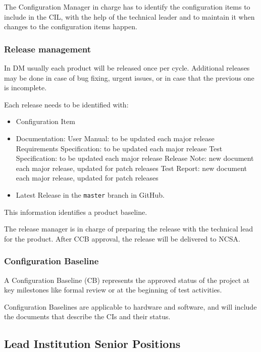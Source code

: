 The Configuration Manager in charge has to identify the configuration items to include in the CIL, with the help of the technical leader and to maintain it when changes to the configuration items happen.


\subsubsection{Release management\label{sect:relMng}}

In DM usually each product will be released once per cycle.
Additional releases may be done in case of bug fixing, urgent issues, or in case that the previous one is incomplete.

Each release needs to be identified with:

\begin{itemize}
\item Configuration Item
\item Documentation:
\subitem User Manual: to be updated each major release
\subitem Requirements Specification: to be updated each major release
\subitem Test Specification: to be updated each major release
\subitem Release Note: new document each major release, updated for patch releases
\subitem Test Report: new document each major release, updated for patch releases
\item Latest Release in the \texttt{master} branch in GitHub.
\end{itemize}
This information identifies a product baseline.

The release manager is in charge of preparing the release with the technical lead for the product.
After CCB approval, the release will be delivered to NCSA.

\subsubsection{Configuration Baseline \label{sect:BSLdef}}

A Configuration Baseline (CB) represents the approved status of the project at key milestones like formal review or at the beginning of test activities.

Configuration Baselines are applicable to hardware and software, and will include the documents that describe the CIs and their status.

\subsection{Lead Institution Senior Positions}


